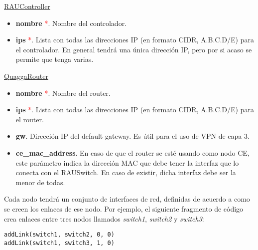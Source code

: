 \underline{RAUController}

\begin{itemize}
	\item \textbf{nombre} \textcolor{red}{*}. Nombre del controlador.
	\item \textbf{ips} \textcolor{red}{*}. Lista con todas las direcciones IP (en formato CIDR, A.B.C.D/E) para el controlador. En general tendrá una única dirección IP, pero por si acaso se permite que tenga varias.
\end{itemize}

\underline{QuaggaRouter}

\begin{itemize}
	\item \textbf{nombre} \textcolor{red}{*}. Nombre del router.
	\item \textbf{ips} \textcolor{red}{*}. Lista con todas las direcciones IP (en formato CIDR, A.B.C.D/E) para el router.
	\item \textbf{gw}.  Dirección IP del default gateway. Es útil para el uso de VPN de capa 3.
	\item \textbf{ce\_mac\_address}. En caso de que el router se esté usando como nodo CE, este parámetro indica la dirección MAC que debe tener la interfaz que lo conecta con el RAUSwitch. En caso de existir, dicha interfaz debe ser la menor de todas.
\end{itemize}

Cada nodo tendrá un conjunto de interfaces de red, definidas de acuerdo a como se creen los enlaces de ese nodo. Por ejemplo, el siguiente fragmento de código crea enlaces entre tres nodos llamados \textit{switch1}, \textit{switch2} y \textit{switch3}:
\begin{lstlisting}
addLink(switch1, switch2, 0, 0)
addLink(switch1, switch3, 1, 0)
\end{lstlisting}

